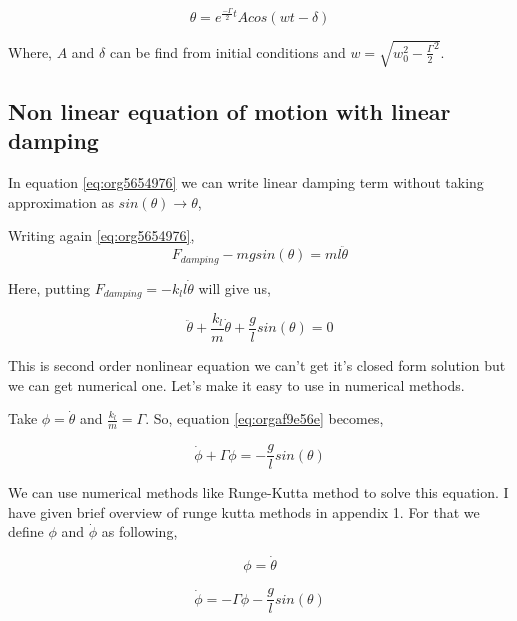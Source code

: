 \documentclass[11pt,a4paper]{article}
\begin{document}
\begin{equation}
\label{eq:org2d9f2a3}
\theta = e^{\frac{-\Gamma}{2}t}A cos(wt-\delta)
\end{equation}

Where, \(A\) and \(\delta\) can be find from initial conditions and \(w = \sqrt{w_{0}^{2}-\frac{\Gamma}{2}^{2}}\).

\subsection{Non linear equation of motion with linear damping}
\label{sec:org85c7ab2}

In equation \ref{eq:org5654976} we can write linear damping term without taking approximation as \(sin(\theta) \to \theta\),

Writing again \ref{eq:org5654976}, 
\begin{equation*}
\label{eq:org189dceb}
F_{damping}-mgsin(\theta)=ml\ddot{\theta}
\end{equation*}

Here, putting \(F_{damping}=-k_{l}l\dot{\theta}\) will give us,

\begin{equation}
\label{eq:orgaf9e56e}
\ddot{\theta}+\frac{k_{l}}{m}\dot{\theta}+\frac{g}{l}sin(\theta)=0
\end{equation}

This is second order nonlinear equation we can't get it's closed form solution but we can get numerical one. Let's make it easy to use in numerical methods.

Take \(\phi = \dot{\theta}\) and \(\frac{k_{l}}{m}=\Gamma\). So, equation \ref{eq:orgaf9e56e} becomes,

\begin{equation}
\label{eq:org0f440e1}
\dot{\phi}+\Gamma\phi=-\frac{g}{l} sin(\theta)
\end{equation}

We can use numerical methods like Runge-Kutta method to solve this equation. I have given brief overview of runge kutta methods in appendix 1. For that we define \(\phi\) and \(\dot{\phi}\) as following,

\begin{equation}
\label{eq:orgfe2e08e}
\phi=\dot{\theta}
\end{equation}

\begin{equation}
\label{eq:org7686a19}
\dot{\phi}=-\Gamma\phi-\frac{g}{l} sin(\theta)
\end{equation}
\end{document}
